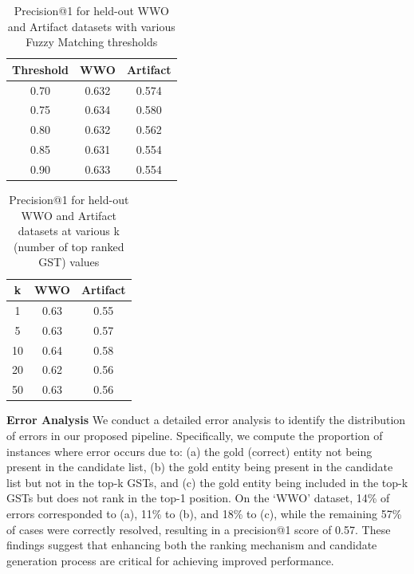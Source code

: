 \documentclass[11pt]{article}
\begin{document}
\begin{table}[htbp]
\centering
\begin{tabular}{c|cc}
Threshold & WWO & Artifact \\ \hline
0.70 & 0.632 & 0.574 \\
0.75 & 0.634 & 0.580 \\
0.80 & 0.632 & 0.562 \\
0.85 & 0.631 & 0.554 \\
0.90 & 0.633 & 0.554 \\
\end{tabular}
\caption{\label{tbl:hyper_threshold}Precision@1 for held-out WWO and Artifact datasets with various Fuzzy Matching thresholds}
\end{table}

\begin{table}[htbp]
\centering
\begin{tabular}{c|cc}
k & WWO & Artifact \\ \hline
1  & 0.63 & 0.55 \\
5  & 0.63 & 0.57 \\
10 & 0.64 & 0.58 \\
20 & 0.62 & 0.56 \\
50 & 0.63 & 0.56 \\
\end{tabular}
\caption{\label{tbl:hyper_k}Precision@1 for held-out WWO and Artifact datasets at various k (number of top ranked GST) values}
\end{table}
\noindent
\textbf{Error Analysis}
We conduct a detailed error analysis to identify the distribution of errors in our proposed pipeline. Specifically, we compute the proportion of instances where error occurs due to: (a) the gold (correct) entity not being present in the candidate list, (b) the gold entity being present in the candidate list but not in the top-k GSTs, and (c) the gold entity being included in the top-k GSTs but does not rank in the top-1 position. On the ‘WWO’ dataset, 14\% of errors corresponded to (a), 11\% to (b), and 18\% to (c), while the remaining 57\% of cases were correctly resolved, resulting in a precision@1 score of 0.57. These findings suggest that enhancing both the ranking mechanism and candidate generation process are critical for achieving improved performance.
\end{document}
